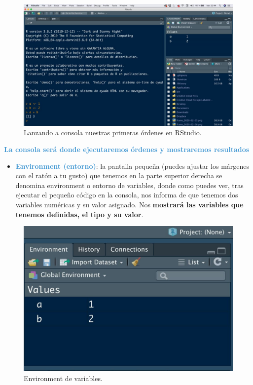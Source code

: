 \documentclass[11pt,]{book}
\providecommand{\tightlist}{%
  \setlength{\itemsep}{0pt}\setlength{\parskip}{0pt}}
\begin{document}
\begin{figure}

{\centering \includegraphics[width=0.6\linewidth]{./img/inicio_rstudio_2} 

}

\caption{Lanzando a consola nuestras primeras órdenes en RStudio.}\label{fig:inicio-rstudio-2}
\end{figure}

\textbf{\textcolor{#4197D2}{La consola será donde ejecutaremos órdenes y mostraremos resultados}}

\begin{itemize}
\tightlist
\item
  \textbf{\textcolor{#4197D2}{Environment (entorno)}}: la pantalla pequeña (puedes ajustar los márgenes con el ratón a tu gusto) que tenemos en la parte superior derecha se denomina environment o entorno de variables, donde como puedes ver, tras ejecutar el pequeño código en la consola, nos informa de que tenemos dos variables numéricas y su valor asignado. Nos \textbf{mostrará las variables que tenemos definidas, el tipo y su valor}.
\end{itemize}

\begin{figure}

{\centering \includegraphics[width=0.65\linewidth]{./img/inicio_rstudio_3} 

}

\caption{Environment de variables.}\label{fig:inicio-rstudio-3}
\end{figure}
\end{document}

